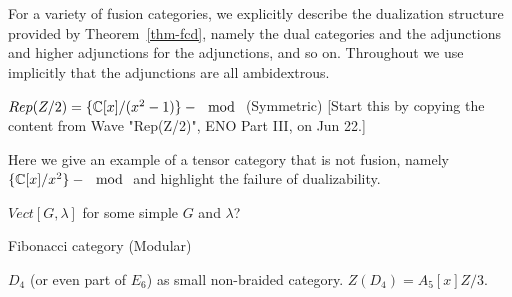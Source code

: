 \documentclass{amsart}
\begin{document}
For a variety of fusion categories, we explicitly describe the dualization structure provided by Theorem~\ref{thm-fcd}, namely the dual categories and the adjunctions and higher adjunctions for the adjunctions, and so on.  Throughout we use implicitly that the adjunctions are all ambidextrous. 

\begin{example}
$Rep(Z/2) = \{\mathbb C[x]/(x^2-1)\}-\mod$ (Symmetric)
[Start this by copying the content from Wave "Rep(Z/2)", ENO Part III, on Jun 22.]
\end{example}

\begin{example}
Here we give an example of a tensor category that is not fusion, namely $\{\mathbb C[x]/x^2\}-\mod$ and highlight the failure of dualizability. 
\end{example}

\begin{example}
$Vect[G,\lambda]$ for some simple $G$ and $\lambda$?
\end{example}

\begin{example}
Fibonacci category (Modular)
\end{example}

\begin{example}
$D_4$ (or even part of $E_6$) as small non-braided category.  $Z(D_4) = A_5 [x] Z/3$.
\end{example}



%
% 
%
\end{document}
